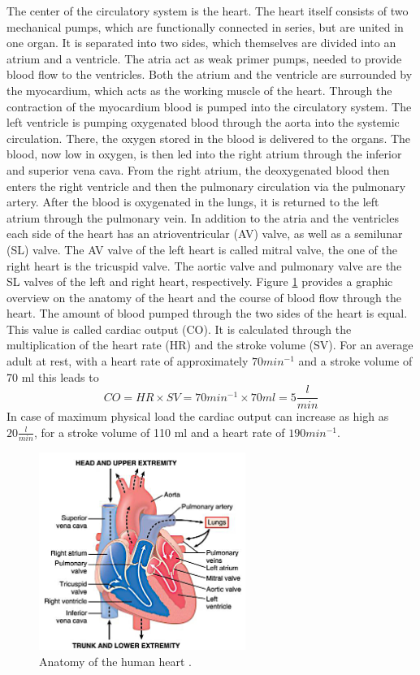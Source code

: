  The center of the circulatory system is the heart. The heart itself consists of two mechanical pumps, which are functionally connected in series, but are united in one organ. It is separated into two sides, which themselves are divided into an atrium and a ventricle. The atria act as weak primer pumps, needed to provide blood flow to the ventricles.\cite{HKS4} Both the atrium and the ventricle are surrounded by the myocardium, which acts as the working muscle of the heart. Through the contraction of the myocardium blood is pumped into the circulatory system.\cite{HKS7} The left ventricle is pumping oxygenated blood through the aorta into the systemic circulation. There, the oxygen stored in the blood is delivered to the organs. The blood, now low in oxygen, is then led into the right atrium through the inferior and superior vena cava. From the right atrium, the deoxygenated blood then enters the right ventricle and then the pulmonary circulation via the pulmonary artery. After the blood is oxygenated in the lungs, it is returned to the left atrium through the pulmonary vein.\cite{HKS4} In addition to the atria and the ventricles each side of the heart has an atrioventricular (AV) valve, as well as a semilunar (SL) valve. The AV valve of the left heart is called mitral valve, the one of the right heart is the tricuspid valve. The aortic valve and pulmonary valve are the SL valves of the left and right heart, respectively.\cite{HKS7} Figure \ref{fig:heart_anat} provides a graphic overview on the anatomy of the heart and the course of blood flow through the heart. The amount of blood pumped through the two sides of the heart is equal. This value is called cardiac output (CO). It is calculated through the multiplication of the heart rate (HR) and the stroke volume (SV). For an average adult at rest, with a heart rate of approximately $70 min^{-1}$ and a stroke volume of 70 ml this leads to
 \begin{equation}
   CO = HR \times SV = 70 min^{-1} \times 70ml = 5 \frac{l}{min}
  \label{eq:CO}
 \end{equation}
In case of maximum physical load the cardiac output can increase as high as $20\frac{l}{min}$, for a stroke volume of 110 ml and a heart rate of $190 min^{-1}$. \cite{HKS4}

\begin{figure}
  \centering
  \includegraphics[width=0.6\textwidth]{images/heart_1.jpg}
  \caption{Anatomy of the human heart \cite{GH20}.}
  \label{fig:heart_anat}
\end{figure}

